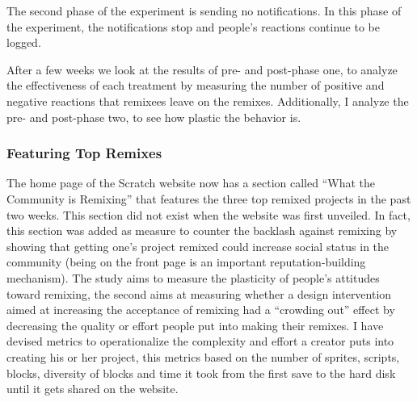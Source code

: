 The second phase of the experiment is sending no notifications. In this phase of the experiment, the notifications stop and people's reactions continue to be logged.

After a few weeks we look at the results of pre- and post-phase one, to analyze the effectiveness of each treatment by measuring the number of positive and negative reactions that remixees leave on the remixes. 
Additionally, I analyze the pre- and post-phase two, to see how plastic the behavior is.

\subsubsection{Featuring Top Remixes}
The home page of the Scratch website now has a section called ``What the Community is Remixing''  that features the three top remixed projects in the past two weeks.
This section did not exist when the website was first unveiled.
In fact, this section was added as measure to counter the backlash against remixing by showing that getting one's project remixed could increase social status in the community (being on the front page is an important reputation-building mechanism).
The study aims to measure the plasticity of people's attitudes toward remixing, the second aims at measuring whether a design intervention aimed at increasing the acceptance of remixing had a ``crowding out'' effect by decreasing the quality or effort people put into making their remixes.
I have devised metrics to operationalize the complexity and effort a creator puts into creating his or her project, this metrics based on the number of sprites, scripts, blocks, diversity of blocks and time it took from the first save to the hard disk until it gets shared on the website.

